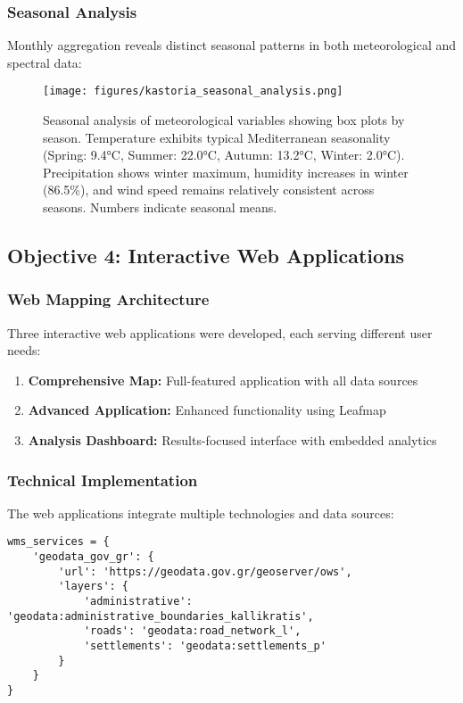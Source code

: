 \documentclass[a4paper,12pt]{article}
\begin{document}
\subsubsection{Seasonal Analysis}

Monthly aggregation reveals distinct seasonal patterns in both meteorological
and spectral data:

\begin{figure}[H]
    \centering
    \texttt{[image: figures/kastoria\_seasonal\_analysis.png]}
    \caption{Seasonal analysis of meteorological variables showing box plots by season. Temperature exhibits typical Mediterranean seasonality (Spring: 9.4°C, Summer: 22.0°C, Autumn: 13.2°C, Winter: 2.0°C). Precipitation shows winter maximum, humidity increases in winter (86.5\%), and wind speed remains relatively consistent across seasons. Numbers indicate seasonal means.}
    \label{fig:seasonal}
\end{figure}

\subsection{Objective 4: Interactive Web Applications}

\subsubsection{Web Mapping Architecture}

Three interactive web applications were developed, each serving different user
needs:

\begin{enumerate}
    \item \textbf{Comprehensive Map:} Full-featured application with all data sources
    \item \textbf{Advanced Application:} Enhanced functionality using Leafmap
    \item \textbf{Analysis Dashboard:} Results-focused interface with embedded analytics
\end{enumerate}

\subsubsection{Technical Implementation}

The web applications integrate multiple technologies and data sources:

\begin{lstlisting}[caption=WMS service integration example]
wms_services = {
    'geodata_gov_gr': {
        'url': 'https://geodata.gov.gr/geoserver/ows',
        'layers': {
            'administrative': 'geodata:administrative_boundaries_kallikratis',
            'roads': 'geodata:road_network_l',
            'settlements': 'geodata:settlements_p'
        }
    }
}
\end{lstlisting}
\end{document}

